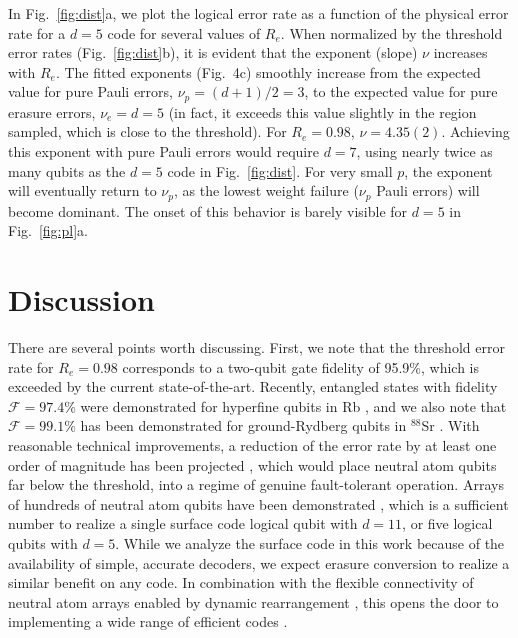 \documentclass[%
reprint,
superscriptaddress,
 amsmath,amssymb,
 aps,
 prx,
floatfix,
]{revtex4-1}
\begin{document}
In Fig.~\ref{fig:dist}a, we plot the logical error rate as a function of the physical error rate for a $d=5$ code for several values of $R_e$. When normalized by the threshold error rates (Fig.~\ref{fig:dist}b), it is evident that the exponent (slope) $\nu$ increases with $R_e$. The fitted exponents (Fig.~4c) smoothly increase from the expected value for pure Pauli errors, $\nu_p = (d+1)/2 = 3$, to the expected value for pure erasure errors, $\nu_e = d = 5$ (in fact, it exceeds this value slightly in the region sampled, which is close to the threshold). For $R_e=0.98$, $\nu = 4.35(2)$. Achieving this exponent with pure Pauli errors would require $d=7$, using nearly twice as many qubits as the $d=5$ code in Fig.~\ref{fig:dist}. For very small $p$, the exponent will eventually return to $\nu_p$, as the lowest weight failure ($\nu_p$ Pauli errors) will become dominant. The onset of this behavior is barely visible for $d=5$ in Fig.~\ref{fig:pl}a.

\section{Discussion}

There are several points worth discussing. First, we note that the threshold error rate for $R_e=0.98$ corresponds to a two-qubit gate fidelity of 95.9\%, which is exceeded by the current state-of-the-art. Recently, entangled states with fidelity $\mathcal{F} = 97.4\%$ were demonstrated for hyperfine qubits in Rb \cite{Levine2019}, and we also note that $\mathcal{F} = 99.1\%$ has been demonstrated for ground-Rydberg qubits in ${}^{88}$Sr \cite{madjarov2020}. With reasonable technical improvements, a reduction of the error rate by at least one order of magnitude has been projected \cite{saffman2020}, which would place neutral atom qubits far below the threshold, into a regime of genuine fault-tolerant operation. Arrays of hundreds of neutral atom qubits have been demonstrated \cite{ebadi2021,scholl2021}, which is a sufficient number to realize a single surface code logical qubit with $d=11$, or five logical qubits with $d=5$. While we analyze the surface code in this work because of the availability of simple, accurate decoders, we expect erasure conversion to realize a similar benefit on any code. In combination with the flexible connectivity of neutral atom arrays enabled by dynamic rearrangement \cite{beugnon2007,yang2016,bluvstein2021}, this opens the door to implementing a wide range of efficient codes \cite{breuckmann2021}.
\end{document}
